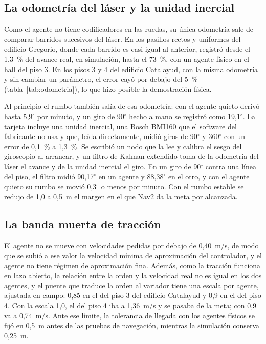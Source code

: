 \subsection{La odometría del láser y la unidad inercial}
\label{sec:odometria-laser}
\label{sec:imu}

Como el agente no tiene codificadores en las ruedas, su única odometría sale de comparar barridos sucesivos del láser. En los pasillos rectos y uniformes del edificio Gregorio, donde cada barrido es casi igual al anterior, registró desde el 1,3~\% del avance real, en simulación, hasta el 73~\%, con un agente físico en el hall del piso 3. En los pisos 3 y 4 del edificio Catalayud, con la misma odometría y sin cambiar un parámetro, el error cayó por debajo del 5~\% (tabla~\ref{tab:odometria}), lo que hizo posible la demostración física.

Al principio el rumbo también salía de esa odometría: con el agente quieto derivó hasta 5,9$^\circ$ por minuto, y un giro de 90$^\circ$ hecho a mano se registró como 19,1$^\circ$. La tarjeta incluye una unidad inercial, una Bosch BMI160 que el software del fabricante no usa y que, leída directamente, midió giros de 90$^\circ$ y 360$^\circ$ con un error de 0,1~\% a 1,3~\%. Se escribió un nodo que la lee y calibra el sesgo del giroscopio al arrancar, y un filtro de Kalman extendido toma de la odometría del láser el avance y de la unidad inercial el giro. En un giro de 90$^\circ$ contra una línea del piso, el filtro midió 90,17$^\circ$ en un agente y 88,38$^\circ$ en el otro, y con el agente quieto su rumbo se movió 0,3$^\circ$ o menos por minuto. Con el rumbo estable se redujo de 1,0 a 0,5~m el margen en el que Nav2 da la meta por alcanzada.

\subsection{La banda muerta de tracción}
\label{sec:banda-muerta}

El agente no se mueve con velocidades pedidas por debajo de 0,40~m/s, de modo que se subió a ese valor la velocidad mínima de aproximación del controlador, y el agente no tiene régimen de aproximación fina. Además, como la tracción funciona en lazo abierto, la relación entre la orden y la velocidad real no es igual en los dos agentes, y el puente que traduce la orden al variador tiene una escala por agente, ajustada en campo: 0,85 en el del piso 3 del edificio Catalayud y 0,9 en el del piso 4. Con la escala 1,0, el del piso 4 iba a 1,36~m/s y se pasaba de la meta; con 0,9 va a 0,74~m/s. Ante ese límite, la tolerancia de llegada con los agentes físicos se fijó en 0,5~m antes de las pruebas de navegación, mientras la simulación conserva 0,25~m.

